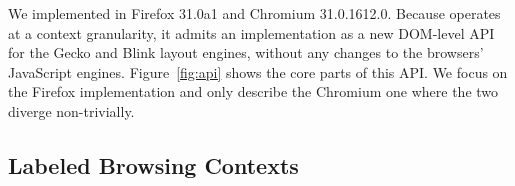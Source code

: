 We implemented \sys{} in Firefox 31.0a1 and Chromium 31.0.1612.0.
%
Because \sys{} operates at a context granularity, it admits an
implementation as a new DOM-level API for the Gecko and Blink layout
engines, without any changes to the browsers' JavaScript engines.
%
Figure~\ref{fig:api} shows the core parts of this API.
%
%
We focus on the Firefox implementation and only describe the Chromium
one where the two diverge non-trivially.
%

\subsection{Labeled Browsing Contexts}
\begin{table}
\centering
{}
\caption{Confining code from exfiltrating data using existing browser
mechanisms.}
\label{tab:comm}
\end{table}
 
